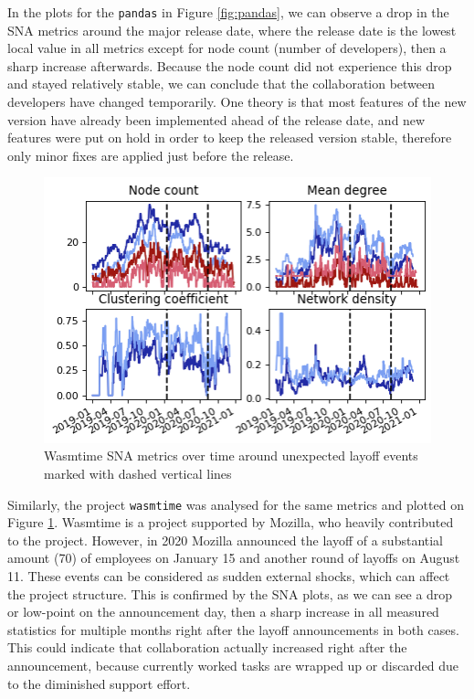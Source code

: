 In the plots for the \texttt{pandas} in Figure \ref{fig:pandas}, we can observe a drop in the SNA metrics around the major release date, where the release date is the lowest local value in all metrics except for node count (number of developers), then a sharp increase afterwards. Because the node count did not experience this drop and stayed relatively stable, we can conclude that the collaboration between developers have changed temporarily. One theory is that most features of the new version have already been implemented ahead of the release date, and new features were put on hold in order to keep the released version stable, therefore only minor fixes are applied just before the release. \\

\begin{figure}[h!]
    \centering
    \includegraphics{figures/wasmtime.png}
    \caption{Wasmtime SNA metrics over time around unexpected layoff events marked with dashed vertical lines}
    \label{fig:wasmtime}
\end{figure}

Similarly, the project \texttt{wasmtime} was analysed for the same metrics and plotted on Figure \ref{fig:wasmtime}. Wasmtime is a project supported by Mozilla, who heavily contributed to the project. However, in 2020 Mozilla announced the layoff of a substantial amount (70) of employees on January 15 and another round of layoffs on August 11. These events can be considered as sudden external shocks, which can affect the project structure. This is confirmed by the SNA plots, as we can see a drop or low-point on the announcement day, then a sharp increase in all measured statistics for multiple months right after the layoff announcements in both cases. This could indicate that collaboration actually increased right after the announcement, because currently worked tasks are wrapped up or discarded due to the diminished support effort. \\


